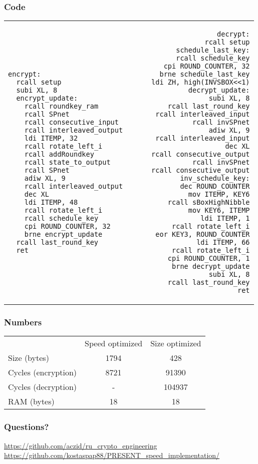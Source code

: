 \documentclass{beamer}
\begin{document}
\lstset{basicstyle=\tiny\sffamily}
\begin{frame}[fragile]
\frametitle{Code}
	\begin{tabular}{ l r }
\begin{lstlisting}
encrypt:
  rcall setup
  subi XL, 8
  encrypt_update:
    rcall roundkey_ram
    rcall SPnet
    rcall consecutive_input
    rcall interleaved_output
    ldi ITEMP, 32
    rcall rotate_left_i
    rcall addRoundkey
    rcall state_to_output
    rcall SPnet
    adiw XL, 9
    rcall interleaved_output
    dec XL
    ldi ITEMP, 48
    rcall rotate_left_i
    rcall schedule_key
    cpi ROUND_COUNTER, 32
    brne encrypt_update
  rcall last_round_key
  ret
\end{lstlisting}
&
\begin{lstlisting}
decrypt:
  rcall setup
  schedule_last_key:
    rcall schedule_key
    cpi ROUND_COUNTER, 32
    brne schedule_last_key
  ldi ZH, high(INVSBOX<<1)
  decrypt_update:
    subi XL, 8
    rcall last_round_key
    rcall interleaved_input
    rcall invSPnet
    adiw XL, 9
    rcall interleaved_input
    dec XL
    rcall consecutive_output
    rcall invSPnet
    rcall consecutive_output
    inv_schedule_key:
      dec ROUND_COUNTER
      mov ITEMP, KEY6
      rcall sBoxHighNibble
      mov KEY6, ITEMP
      ldi ITEMP, 1
      rcall rotate_left_i
      eor KEY3, ROUND_COUNTER
      ldi ITEMP, 66
      rcall rotate_left_i
    cpi ROUND_COUNTER, 1
    brne decrypt_update
  subi XL, 8
  rcall last_round_key
  ret
\end{lstlisting}
	\end{tabular}
\end{frame}


\begin{frame}[fragile]
\frametitle{Numbers}
	\begin{tabular}{ l c c }

                & Speed optimized & Size optimized \\
        Size (bytes) & 1794 & 428 \\
        Cycles (encryption) & 8721 & 91390 \\
        Cycles (decryption) & - & 104937 \\
        RAM (bytes) & 18 & 18

	\end{tabular}
\end{frame}

\begin{frame}[fragile]
\frametitle{Questions?}
	\footnotesize{
	\url{https://github.com/aczid/ru_crypto_engineering}
	\url{https://github.com/kostaspap88/PRESENT_speed_implementation/}
	}
\end{frame}
\end{document}
